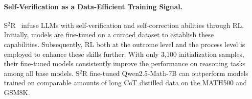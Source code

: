 \paragraph{\textbf{Self-Verification as a Data-Efficient Training Signal.}} S$^2$R~\cite{ma2025s2rteachingllmsselfverify} infuse LLMs with self-verification and self-correction abilities through RL. Initially, models are fine-tuned on a curated dataset to establish these capabilities. Subsequently, RL both at the outcome level and the process level is employed to enhance these skills further. With only 3,100 initialization samples, their fine-tuned models consistently improve the performance on reasoning tasks among all base models. S$^2$R fine-tuned Qwen2.5-Math-7B can outperform models trained on comparable amounts of long CoT distilled data on the MATH500 and GSM8K. 

